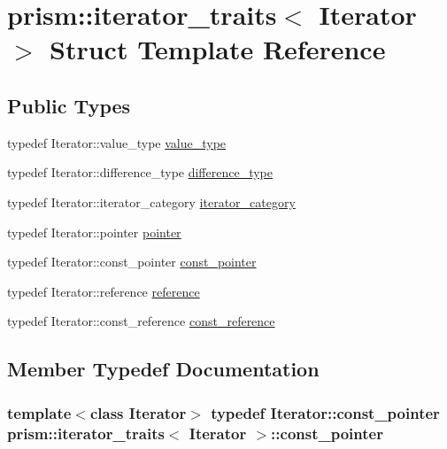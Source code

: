 \hypertarget{structprism_1_1iterator__traits}{}\section{prism\+:\+:iterator\+\_\+traits$<$ Iterator $>$ Struct Template Reference}
\label{structprism_1_1iterator__traits}
\subsection*{Public Types}
\begin{DoxyCompactItemize}
\item 
typedef Iterator\+::value\+\_\+type \hyperlink{structprism_1_1iterator__traits_a897219622ddfbb1f94aba0cc575cb30c}{value\+\_\+type}
\item 
typedef Iterator\+::difference\+\_\+type \hyperlink{structprism_1_1iterator__traits_ae78f6fab069fd9118d558db5d4f81d54}{difference\+\_\+type}
\item 
typedef Iterator\+::iterator\+\_\+category \hyperlink{structprism_1_1iterator__traits_a3ae4da59bd72e7026c5fe2a23e799e1b}{iterator\+\_\+category}
\item 
typedef Iterator\+::pointer \hyperlink{structprism_1_1iterator__traits_a74c12fd61a29bfd2a645a8d798e93810}{pointer}
\item 
typedef Iterator\+::const\+\_\+pointer \hyperlink{structprism_1_1iterator__traits_a6acb84b2431eb855d4e51c8dd16cb5e5}{const\+\_\+pointer}
\item 
typedef Iterator\+::reference \hyperlink{structprism_1_1iterator__traits_a18c26ae6eea81bdaeb3bd4e15038eca7}{reference}
\item 
typedef Iterator\+::const\+\_\+reference \hyperlink{structprism_1_1iterator__traits_a27032f81f31f64773f63693623fd4023}{const\+\_\+reference}
\end{DoxyCompactItemize}


\subsection{Member Typedef Documentation}
\subsubsection[{\texorpdfstring{const\+\_\+pointer}{const_pointer}}]{\setlength{\rightskip}{0pt plus 5cm}template$<$class Iterator$>$ typedef Iterator\+::const\+\_\+pointer {\bf prism\+::iterator\+\_\+traits}$<$ Iterator $>$\+::{\bf const\+\_\+pointer}}\hypertarget{structprism_1_1iterator__traits_a6acb84b2431eb855d4e51c8dd16cb5e5}{}\label{structprism_1_1iterator__traits_a6acb84b2431eb855d4e51c8dd16cb5e5}
